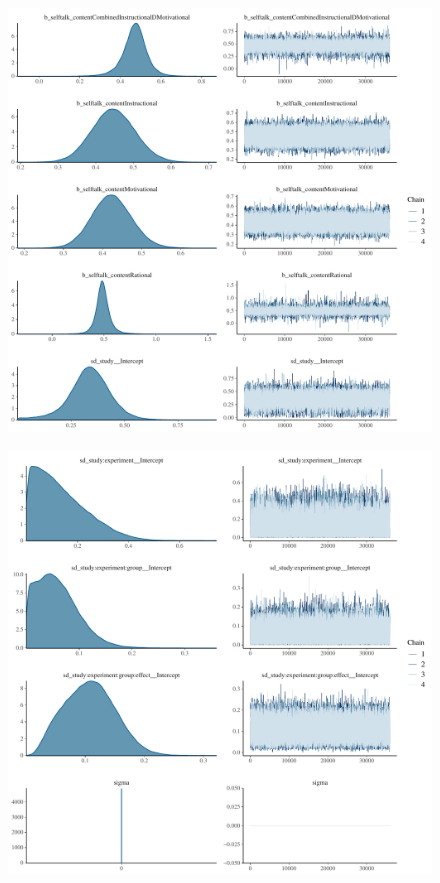 \documentclass[
]{report}
\begin{document}
\begin{figure}

{\centering \includegraphics[width=1\textwidth,height=\textheight]{diagnostic_plots_files/figure-pdf/unnamed-chunk-11-1.pdf}

}

\end{figure}

\begin{figure}

{\centering \includegraphics[width=1\textwidth,height=\textheight]{diagnostic_plots_files/figure-pdf/unnamed-chunk-11-2.pdf}

}

\end{figure}
\end{document}
